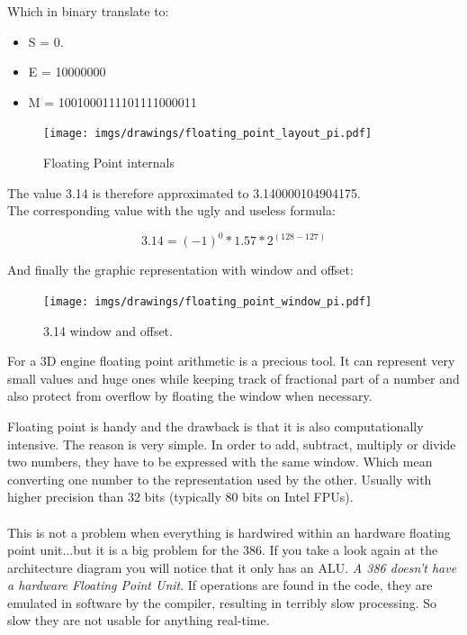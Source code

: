 \documentclass[book.tex]{subfiles}
\begin{document}
Which in binary translate to:

\begin{itemize}
\item S = 0.
\item E = 10000000
\item M = 1001000111101111000011
\end{itemize}

\begin{figure}[H]
\centering
\texttt{[image: imgs/drawings/floating\_point\_layout\_pi.pdf]}
\caption{Floating Point internals}
\label{fig:fp_internals}
\end{figure}
  \bigskip

The value 3.14 is therefore approximated to 3.140000104904175.\\

The corresponding value with the ugly and useless formula:

\begin{equation}
3.14 = (-1)^0 * 1.57 * 2^{(128-127)}
\end{equation}

\bigskip

And finally the graphic representation with window and offset:\\

\begin{figure}[H]
\centering
\texttt{[image: imgs/drawings/floating\_point\_window\_pi.pdf]}

\caption{3.14 window and offset.}
\label{fig:fp_internals}
\end{figure}
  \bigskip

For a 3D engine floating point arithmetic is a precious tool. It can represent very small values and huge ones while keeping track of fractional part of a number and also protect from overflow by floating the window when necessary.\\
\par
Floating point is handy and the drawback is that it is also computationally intensive. The reason is very simple. In order to add, subtract, multiply or divide two numbers, they have to be expressed with the same window. Which mean converting one number to the representation used by the other. Usually with higher precision than 32 bits (typically 80 bits on Intel FPUs).\\
\\
This is not a problem when everything is hardwired within an hardware floating point unit...but it is a big problem for the 386. If you take a look again at the architecture diagram you will notice that it only has an ALU. \emph{A 386 doesn't have a hardware Floating Point Unit}. If  operations are found in the code, they are emulated in software by the compiler, resulting in terribly slow processing. So slow they are not usable for anything real-time.\\ 
\par
\end{document}
